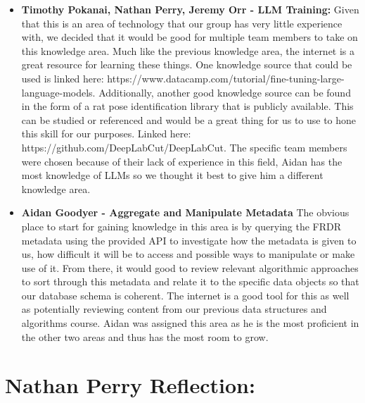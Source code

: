 \begin{enumerate}
\begin{itemize}
      \item \textbf{Timothy Pokanai, Nathan Perry, Jeremy Orr - LLM Training: }Given that this is an area of technology that our group has very
      little experience with, we decided that it would be good for multiple team members to take on this knowledge area. Much like the previous knowledge
      area, the internet is a great resource for learning these things. One knowledge source that could be used is linked here: https://www.datacamp.com/tutorial/fine-tuning-large-language-models.
      Additionally, another good knowledge source can be found in the form of a rat pose identification library that is publicly available. This
      can be studied or referenced and would be a great thing for us to use to hone this skill for our purposes. Linked here: https://github.com/DeepLabCut/DeepLabCut.
      The specific team members were chosen because of their lack of experience in this field, Aidan has the most knowledge of LLMs so we thought it best
      to give him a different knowledge area.

    \item \textbf{Aidan Goodyer - Aggregate and Manipulate Metadata} The obvious place to start for gaining knowledge in this area is by querying the FRDR metadata
    using the provided API to investigate how the metadata is given to us, how difficult it will be to access and possible ways to manipulate or 
    make use of it. From there, it would good to review relevant algorithmic approaches to sort through this metadata and relate it to the specific
    data objects so that our database schema is coherent. The internet is a good tool for this as well as potentially reviewing content from our previous
    data structures and algorithms course. Aidan was assigned this area as he is the most proficient in the other two areas and thus has the most
    room to grow.

\end{itemize}

\end{enumerate}

\section{Nathan Perry Reflection:}

